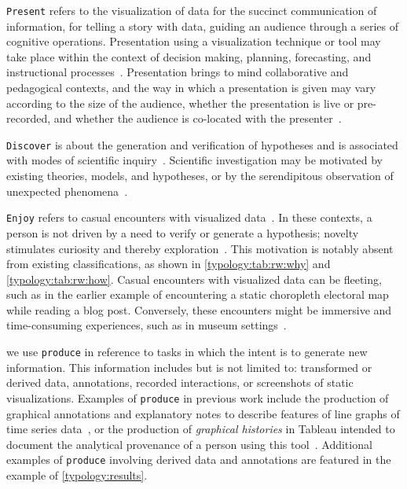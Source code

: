 {\tt Present}
refers to the visualization of data for the succinct communication of information, for telling a story with data, guiding an audience through a series of cognitive operations.
Presentation using a visualization technique or tool may take place within the context of decision making, planning, forecasting, and instructional processes~\cite{Friel2001,Marchionini2006,Roth2012,Roth2013}.
Presentation brings to mind collaborative and pedagogical contexts, and the way in which a presentation is given may vary according to the size of the audience, whether the presentation is live or pre-recorded, and whether the audience is co-located with the presenter~\cite{Kosara2013}.

{\tt Discover}
is about the generation and verification of hypotheses and is associated with modes of scientific inquiry~\cite{Pike2009}.
Scientific investigation may be motivated by existing theories, models, and hypotheses, or by the serendipitous observation of unexpected phenomena~\cite{Andre2009}.

{\tt Enjoy}
refers to casual encounters with visualized data~\cite{Pousman2007,Sprague2012}.
In these contexts, a person is not driven by a need to verify or generate a hypothesis; novelty stimulates curiosity and thereby exploration~\cite{Dork2011,Sprague2012,Stephenson1967,Toms2000}.
This motivation is notably absent from existing classifications, as shown in \autoref{typology:tab:rw:why} and \autoref{typology:tab:rw:how}.
Casual encounters with visualized data can be fleeting, such as in the earlier example of encountering a static choropleth electoral map while reading a blog post.
Conversely, these encounters might be immersive and time-consuming experiences, such as in museum settings~\cite{Pousman2007}.

we use {\tt produce} in reference to tasks in which the intent is to generate new information.
This information includes but is not limited to: transformed or derived data, annotations, recorded interactions, or screenshots of static visualizations.
Examples of {\tt produce} in previous work include the production of graphical annotations and explanatory notes to describe features of line graphs of time series data~\cite{Willett2012}, or the production of {\it graphical histories} in Tableau intended to document the analytical provenance of a person using this tool~\cite{Heer2008}.
Additional examples of {\tt produce} involving derived data and annotations are featured in the example of \autoref{typology:results}.

